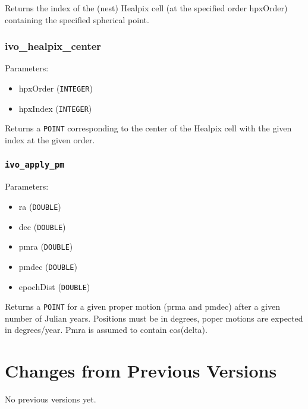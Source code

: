 \documentclass[11pt,a4paper]{ivoa}
\begin{document}
Returns the index of the (nest) Healpix cell (at the specified order
hpxOrder) containing the specified spherical point.

\subsubsection{ivo\_healpix\_center}

Parameters:

\begin{itemize}
	\item hpxOrder (\texttt{INTEGER})
	\item hpxIndex (\texttt{INTEGER})
\end{itemize}

Returns a \texttt{POINT} corresponding to the center of the Healpix cell
with the given index at the given order.

\subsubsection{\texttt{ivo\_apply\_pm}}

Parameters:

\begin{itemize}
	\item ra (\texttt{DOUBLE})
	\item dec (\texttt{DOUBLE})
	\item pmra (\texttt{DOUBLE})
	\item pmdec (\texttt{DOUBLE})
	\item epochDist (\texttt{DOUBLE})
\end{itemize}

Returns a \texttt{POINT} for a given proper motion (prma and pmdec)
after a given number of Julian years. Positions must be in degrees,
poper motions are expected in degrees/year. Pmra is assumed to contain
cos(delta).

\appendix
\section{Changes from Previous Versions}

No previous versions yet.  



\end{document}
